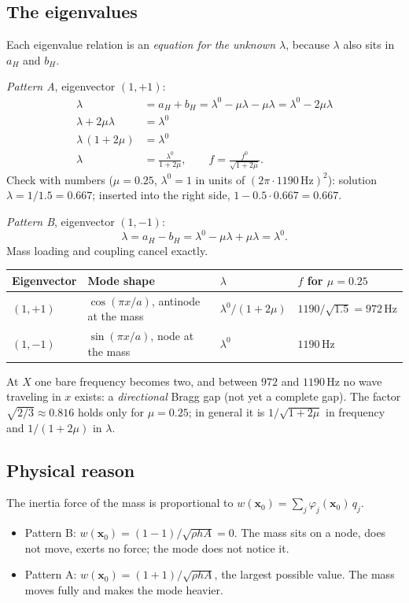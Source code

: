 \subsection{The eigenvalues}
Each eigenvalue relation is an \emph{equation for the unknown $\lambda$},
because $\lambda$ also sits in $a_H$ and $b_H$.

\emph{Pattern A}, eigenvector $(1, +1)$:
\begin{align}
  \lambda &= a_H + b_H = \lambda^0 - \mu\lambda - \mu\lambda = \lambda^0 - 2\mu\lambda \\
  \lambda + 2\mu\lambda &= \lambda^0 \\
  \lambda\,(1 + 2\mu) &= \lambda^0 \\
  \lambda &= \frac{\lambda^0}{1 + 2\mu}, \qquad f = \frac{f^0}{\sqrt{1 + 2\mu}} .
\end{align}
Check with numbers ($\mu = 0.25$, $\lambda^0 = 1$ in units of
$(2\pi\cdot 1190\,\mathrm{Hz})^2$): solution $\lambda = 1/1.5 = 0.667$;
inserted into the right side, $1 - 0.5 \cdot 0.667 = 0.667$.

\emph{Pattern B}, eigenvector $(1, -1)$:
\begin{equation}
  \lambda = a_H - b_H = \lambda^0 - \mu\lambda + \mu\lambda = \lambda^0 .
\end{equation}
Mass loading and coupling cancel exactly.

\begin{center}
\begin{tabular}{|l|p{}|l|l|}
\hline
Eigenvector & Mode shape & $\lambda$ & $f$ for $\mu = 0.25$ \\
\hline
$(1,+1)$ & $\cos(\pi x/a)$, antinode at the mass & $\lambda^0/(1+2\mu)$ & $1190/\sqrt{1.5} = 972\,\mathrm{Hz}$ \\
$(1,-1)$ & $\sin(\pi x/a)$, node at the mass & $\lambda^0$ & $1190\,\mathrm{Hz}$ \\
\hline
\end{tabular}
\end{center}
At $X$ one bare frequency becomes two, and between $972$ and
$1190\,\mathrm{Hz}$ no wave traveling in $x$ exists: a \emph{directional}
Bragg gap (not yet a complete gap). The factor $\sqrt{2/3} \approx 0.816$
holds only for $\mu = 0.25$; in general it is $1/\sqrt{1+2\mu}$ in frequency
and $1/(1+2\mu)$ in $\lambda$.

\subsection{Physical reason}
The inertia force of the mass is proportional to
$w(\mathbf{x}_0) = \sum_j \varphi_j(\mathbf{x}_0)\, q_j$.
\begin{itemize}
  \item Pattern B: $w(\mathbf{x}_0) = (1 - 1)/\sqrt{\rho h A} = 0$. The mass
        sits on a node, does not move, exerts no force; the mode does not
        notice it.
  \item Pattern A: $w(\mathbf{x}_0) = (1 + 1)/\sqrt{\rho h A}$, the largest
        possible value. The mass moves fully and makes the mode heavier.
\end{itemize}

